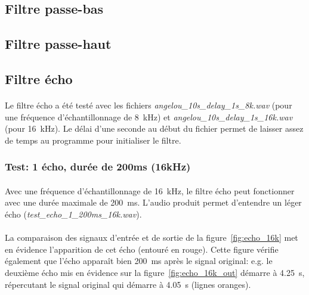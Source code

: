 \documentclass{article}
\begin{document}
    \subsection{Filtre passe-bas}


    \subsection{Filtre passe-haut}


    \subsection{Filtre écho}
    \paragraph{}
    Le filtre écho a été testé avec les fichiers \emph{angelou\_10s\_delay\_1s\_8k.wav} (pour une fréquence d'échantillonnage de \SI{8}{\kilo\hertz}) et \emph{angelou\_10s\_delay\_1s\_16k.wav} (pour \SI{16}{\kilo\hertz}). Le délai d'une seconde au début du fichier permet de laisser assez de temps au programme pour initialiser le filtre.

    \subsubsection{Test: 1 écho, durée de 200ms (16kHz)}
    \paragraph{}
    Avec une fréquence d'échantillonnage de \SI{16}{\kilo\hertz}, le filtre écho peut fonctionner avec une durée maximale de \SI{200}{\milli\second}. L'audio produit permet d'entendre un léger écho (\emph{test\_echo\_1\_200ms\_16k.wav}).

    \paragraph{}
    La comparaison des signaux d'entrée et de sortie de la figure~\ref{fig:echo_16k} met en évidence l'apparition de cet écho (entouré en rouge). Cette figure vérifie également que l'écho apparaît bien \SI{200}{\milli\second} après le signal original: e.g. le deuxième écho mis en évidence sur la figure~\ref{fig:echo_16k_out} démarre à \SI{4.25}{\second}, répercutant le signal original qui démarre à \SI{4.05}{\second} (lignes oranges).
\end{document}

